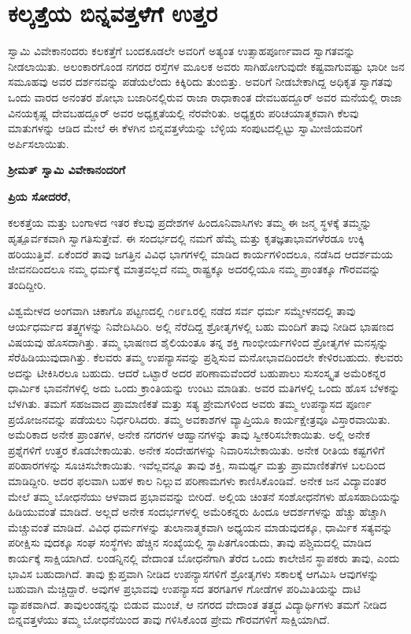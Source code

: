 
\chapter{ಕಲ್ಕತ್ತೆಯ ಬಿನ್ನವತ್ತಳೆಗೆ ಉತ್ತರ}

ಸ್ವಾಮಿ ವಿವೇಕಾನಂದರು ಕಲಕತ್ತೆಗೆ ಬಂದಕೂಡಲೇ ಅವರಿಗೆ ಅತ್ಯಂತ ಉತ್ಸಾಹಪೂರ್ಣವಾದ ಸ್ವಾಗತವನ್ನು ನೀಡಲಾಯಿತು. ಅಲಂಕಾರಗೊಂಡ ನಗರದ ರಸ್ತೆಗಳ ಮೂಲಕ ಅವರು ಸಾಗಿಹೋಗುವುದೇ ಕಷ್ಟವಾಗುವಷ್ಟು ಭಾರೀ ಜನ ಸಮೂಹವು ಅವರ ದರ್ಶನವನ್ನು ಪಡೆಯಲೆಂದು ಕಿಕ್ಕಿರಿದು ತುಂಬಿತ್ತು. ಅವರಿಗೆ ನೀಡಬೇಕಾಗಿದ್ದ ಅಧಿಕೃತ ಸ್ವಾಗತವು ಒಂದು ವಾರದ ಅನಂತರ ಶೋಭಾ ಬಜಾರಿನಲ್ಲಿರುವ ರಾಜಾ ರಾಧಾಕಾಂತ ದೇವಬಹದ್ದೂರ್​ ಅವರ ಮನೆಯಲ್ಲಿ ರಾಜಾ ವಿನಯಕೃಷ್ಣ ದೇವಬಹದ್ದೂರ್​ ಅವರ ಅಧ್ಯಕ್ಷತೆಯಲ್ಲಿ ನೆರವೇರಿತು. ಅಧ್ಯಕ್ಷರು ಪರಿಚಯಾತ್ಮಕವಾಗಿ ಕೆಲವು ಮಾತುಗಳನ್ನು ಆಡಿದ ಮೇಲೆ ಈ ಕೆಳಗಿನ ಬಿನ್ನವತ್ತಳೆಯನ್ನು ಬೆಳ್ಳಿಯ ಸಂಪುಟದಲ್ಲಿಟ್ಟು ಸ್ವಾಮೀಜಿಯವರಿಗೆ ಅರ್ಪಿಸಲಾಯಿತು. 

\textbf{ಶ‍್ರೀಮತ್​ ಸ್ವಾಮಿ ವಿವೇಕಾನಂದರಿಗೆ}

\textbf{ಪ್ರಿಯ ಸೋದರರೆ, }

ಕಲಕತ್ತೆಯ ಮತ್ತು ಬಂಗಾಳದ ಇತರ ಕೆಲವು ಪ್ರದೇಶಗಳ ಹಿಂದೂನಿವಾಸಿಗಳು ತಮ್ಮ ಈ ಜನ್ಮ ಸ್ಥಳಕ್ಕೆ ತಮ್ಮನ್ನು ಹೃತ್ಪೂರ್ವಕವಾಗಿ ಸ್ವಾಗತಿಸುತ್ತೇವೆ. ಈ ಸಂದರ್ಭದಲ್ಲಿ ನಮಗೆ ಹೆಮ್ಮೆ ಮತ್ತು ಕೃತಜ್ಞತಾಭಾವಗಳೆರಡೂ ಉಕ್ಕಿ ಹರಿಯುತ್ತಿವೆ. ಏಕೆಂದರೆ ತಾವು ಜಗತ್ತಿನ ವಿವಿಧ ಭಾಗಗಳಲ್ಲಿ ಮಾಡಿದ ಕಾರ್ಯಗಳಿಂದಲೂ, ನಡೆಸಿದ ಆದರ್ಶಮಯ ಜೀವನದಿಂದಲೂ ನಮ್ಮ ಧರ್ಮಕ್ಕೆ ಮಾತ್ರವಲ್ಲದೆ ನಮ್ಮ ರಾಷ್ಟ್ರಕ್ಕೂ ಅದರಲ್ಲಿಯೂ ನಮ್ಮ ಪ್ರಾಂತಕ್ಕೂ ಗೌರವವನ್ನು ತಂದಿದ್ದೀರಿ. 

ವಿಶ್ವಮೇಳದ ಅಂಗವಾಗಿ ಚಿಕಾಗೊ ಪಟ್ಟಣದಲ್ಲಿ ೧೮೯೩ರಲ್ಲಿ ನಡೆದ ಸರ್ವ ಧರ್ಮ ಸಮ್ಮೇಳನದಲ್ಲಿ ತಾವು ಆರ್ಯಧರ್ಮದ ತತ್ತ್ವಗಳನ್ನು ನಿವೇದಿಸಿದಿರಿ. ಅಲ್ಲಿ ನೆರೆದಿದ್ದ ಶ್ರೋತೃಗಳಲ್ಲಿ ಬಹು ಮಂದಿಗೆ ತಾವು ನೀಡಿದ ಭಾಷಣದ ವಿಷಯವು ಹೊಸದಾಗಿತ್ತು. ತಮ್ಮ ಭಾಷಣದ ಶೈಲಿಯಂತೂ ತನ್ನ ಶಕ್ತಿ ಗಾಂಭೀರ್ಯಗಳಿಂದ ಶ್ರೋತೃಗಳ ಮನಸ್ಸನ್ನು ಸೆರೆಹಿಡಿಯುವುದಾಗಿತ್ತು. ಕೆಲವರು ತಮ್ಮ ಉಪನ್ಯಾಸವನ್ನು ಪ್ರಶ್ನಿಸುವ ಮನೋಭಾವದಿಂದಲೇ ಕೇಳಿರಬಹುದು. ಕೆಲವರು ಅದನ್ನು ಟೀಕಿಸಿರಲೂ ಬಹುದು. ಆದರೆ ಒಟ್ಟಾರೆ ಅದರ ಪರಿಣಾಮವೆಂದರೆ ಬಹುಪಾಲು ಸುಸಂಸ್ಕೃತ ಅಮೆರಿಕನ್ನರ ಧಾರ್ಮಿಕ ಭಾವನೆಗಳಲ್ಲಿ ಅದು ಒಂದು ಕ್ರಾಂತಿಯನ್ನು ಉಂಟು ಮಾಡಿತು. ಅವರ ಮತಿಗಳಲ್ಲಿ ಒಂದು ಹೊಸ ಬೆಳಕನ್ನು ಬೆಳಗಿತು. ತಮಗೆ ಸಹಜವಾದ ಪ್ರಾಮಾಣಿಕತೆ ಮತ್ತು ಸತ್ಯ ಪ್ರೇಮಗಳಿಂದ ಅವರು ತಮ್ಮ ಉಪನ್ಯಾಸದ ಪೂರ್ಣ ಪ್ರಯೋಜನವನ್ನು ಪಡೆಯಲು ನಿರ್ಧರಿಸಿದರು. ತಮ್ಮ ಅವಕಾಶಗಳ ವ್ಯಾಪ್ತಿಯೂ ಕಾರ್ಯಕ್ಷೇತ್ರವೂ ವಿಸ್ತಾರವಾಯಿತು. ಅಮೆರಿಕಾದ ಅನೇಕ ಪ್ರಾಂತಗಳ, ಅನೇಕ ನಗರಗಳ ಆಹ್ವಾನಗಳನ್ನು ತಾವು ಸ್ವೀಕರಿಸಬೇಕಾಯಿತು. ಅಲ್ಲಿ ಅನೇಕ ಪ್ರಶ್ನೆಗಳಿಗೆ ಉತ್ತರ ಕೊಡಬೇಕಾಯಿತು. ಅನೇಕ ಸಂದೇಹಗಳನ್ನು ನಿವಾರಿಸಬೇಕಾಯಿತು. ಅನೇಕ ರೀತಿಯ ಕಷ್ಟಗಳಿಗೆ ಪರಿಹಾರಗಳನ್ನು ಸೂಚಿಸಬೇಕಾಯಿತು. ಇವೆಲ್ಲವನ್ನೂ ತಾವು ಶಕ್ತಿ, ಸಾಮರ್ಥ್ಯ ಮತ್ತು ಪ್ರಾಮಾಣಿಕತೆಗಳ ಬಲದಿಂದ ಮಾಡಿದ್ದೀರಿ. ಅದರ ಫಲವಾಗಿ ಬಹಳ ಕಾಲ ನಿಲ್ಲುವ ಪರಿಣಾಮಗಳು ಕಾಣಿಸಿಕೊಂಡಿವೆ. ಅನೇಕ ಜನ ವಿದ್ಯಾವಂತರ ಮೇಲೆ ತಮ್ಮ ಬೋಧನೆಯು ಆಳವಾದ ಪ್ರಭಾವವನ್ನು ಬೀರಿದೆ. ಅಲ್ಲಿಯ ಚಿಂತನೆ ಸಂಶೋಧನೆಗಳು ಹೊಸಹಾದಿಯನ್ನು ಹಿಡಿಯುವಂತೆ ಮಾಡಿದೆ. ಅಲ್ಲದೆ ಅನೇಕ ಸಂದರ್ಭಗಳಲ್ಲಿ ಅಮೆರಿಕನ್ನರು ಹಿಂದೂ ಆದರ್ಶಗಳನ್ನು ಹೆಚ್ಚು ಹೆಚ್ಚಾಗಿ ಮೆಚ್ಚುವಂತೆ ಮಾಡಿದೆ. ವಿವಿಧ ಧರ್ಮಗಳನ್ನು ತುಲಾನಾತ್ಮಕವಾಗಿ ಅಧ್ಯಯನ ಮಾಡುವುದಕ್ಕೂ, ಧಾರ್ಮಿಕ ಸತ್ಯವನ್ನು ಪರೀಕ್ಷಿಸು ವುದಕ್ಕೂ ಸಂಘ ಸಂಸ್ಥೆಗಳು ಹೆಚ್ಚಿನ ಸಂಖ್ಯೆಯಲ್ಲಿ ಸ್ಥಾಪಿತಗೊಂಡುದು, ತಾವು ಪಶ್ಚಿಮದಲ್ಲಿ ಮಾಡಿದ ಕಾರ್ಯಕ್ಕೆ ಸಾಕ್ಷಿಯಾಗಿದೆ. ಲಂಡನ್ನಿನಲ್ಲಿ ವೇದಾಂತ ಬೋಧನೆಗಾಗಿ ತೆರೆದ ಒಂದು ಕಾಲೇಜಿನ ಸ್ಥಾಪಕರು ತಾವು, ಎಂದು ಭಾವಿಸ ಬಹುದಾಗಿದೆ. ತಾವು ಕ್ಲುಪ್ತವಾಗಿ ನೀಡಿದ ಉಪನ್ಯಾಸಗಳಿಗೆ ಶ್ರೋತೃಗಳು ಸಕಾಲಕ್ಕೆ ಆಗಮಿಸಿ ಆವುಗಳನ್ನು ಬಹುವಾಗಿ ಮೆಚ್ಚಿದ್ದಾರೆ. ಅವುಗಳ ಪ್ರಭಾವವು ಉಪನ್ಯಾಸದ ತರಗತಿಗಳ ಗೋಡೆಗಳ ಪರಿಮಿತಿಯನ್ನು ದಾಟಿ ವ್ಯಾಪಕವಾಗಿದೆ. ತಾವುಲಂಡನ್ನನ್ನು ಬಿಡುವ ಮುಂಚೆ, ಆ ನಗರದ ವೇದಾಂತ ತತ್ತ್ವದ ವಿದ್ಯಾರ್ಥಿಗಳು ತಮಗೆ ನೀಡಿದ ಬಿನ್ನವತ್ತಳೆಯು ತಮ್ಮ ಬೋಧನೆಯಿಂದ ತಾವು ಗಳಿಸಿಕೊಂಡ ಪ್ರೇಮ ಗೌರವಗಳಿಗೆ ಸಾಕ್ಷಿಯಾಗಿದೆ. 

